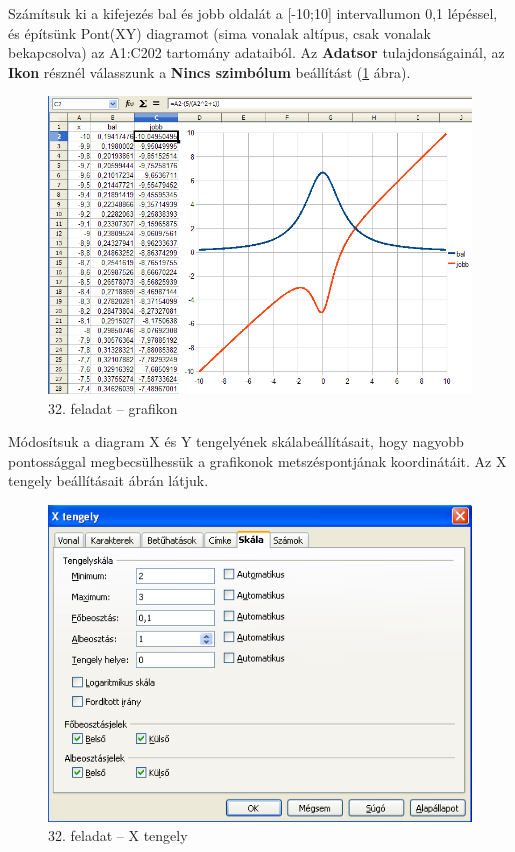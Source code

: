 Számítsuk ki a kifejezés bal és jobb oldalát a [-10;10]
intervallumon 0,1 lépéssel, és építsünk Pont(XY) diagramot
(sima vonalak altípus, csak vonalak bekapcsolva) az A1:C202
tartomány adataiból. Az \textbf{Adatsor} tulajdonságainál, az
\textbf{Ikon} résznél válasszunk a \textbf{Nincs szimbólum}
beállítást (\ref{32-feladatGrafikon} ábra).

\begin{figure}[!h]
\begin{center}
\includegraphics[width=15.999cm]{oocalcv1-img142.png}
\caption{32. feladat -- grafikon}\label{32-feladatGrafikon}
\end{center}
\end{figure}

Módosítsuk a diagram X és Y tengelyének
skálabeállításait, hogy nagyobb pontossággal
megbecsülhessük a grafikonok metszéspontjának koordinátáit.
Az X tengely beállításait  ábrán látjuk.

\begin{figure}[!h]
\begin{center}
\includegraphics[width=12.917cm]{oocalcv1-img143.png}
\caption{32. feladat --  X tengely}\label{32-feladatXtengely}
\end{center}
\end{figure}

